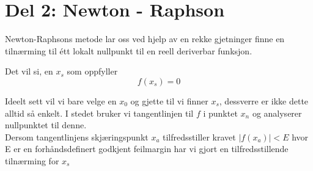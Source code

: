 \section{Del 2: Newton - Raphson}
Newton-Raphsons metode lar oss ved hjelp av en rekke gjetninger finne en tilnærming til étt lokalt nullpunkt til en reell deriverbar funksjon.
\begin{center}
    Det vil si, en \(x_{s}\) som oppfyller
    \[f(x_{s})=0\]
\end{center}
Ideelt sett vil vi bare velge en \(x_{0}\) og gjette til vi finner \(x_{s}\), dessverre er ikke dette alltid så enkelt. I stedet bruker vi tangentlinjen til \(f\) i punktet \(x_{n}\) og analyserer nullpunktet til denne. \\
Dersom tangentlinjens skjæringspunkt \(x_{a}\) tilfredsstiller kravet \(|f(x_{a})|<E\) hvor E er en forhåndsdefinert godkjent feilmargin har vi gjort en tilfredsstillende tilnærming for \(x_{s}\)
